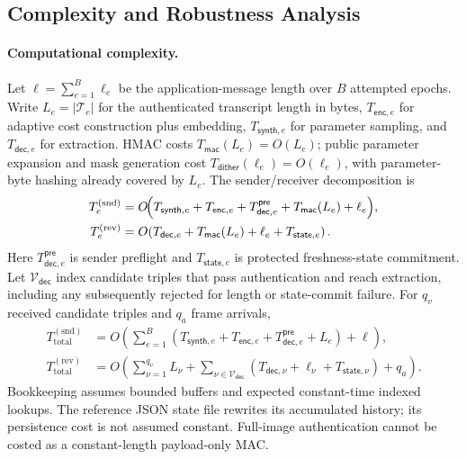 \documentclass[pdflatex,sn-mathphys-num]{sn-jnl}%
\theoremstyle{definition}
\theoremstyle{game}
\theoremstyle{thmstyleone}%
\theoremstyle{thmstyletwo}%
\theoremstyle{thmstylethree}%
\begin{document}
\subsection{Complexity and Robustness Analysis}\label{subsec:complexity-robustness}
\paragraph{Computational complexity.}
Let $\ell=\sum_{e=1}^{B}\ell_e$ be the application-message length over
$B$ attempted epochs. Write $L_e=|\mathcal T_e|$ for the authenticated
transcript length in bytes, $T_{\mathsf{enc},e}$ for adaptive cost construction
plus embedding, $T_{\mathsf{synth},e}$ for parameter sampling, and
$T_{\mathsf{dec},e}$ for extraction. HMAC costs
$T_{\mathsf{mac}}(L_e)=O(L_e)$; public parameter expansion and mask generation
cost $T_{\mathsf{dither}}(\ell_e)=O(\ell_e)$, with parameter-byte hashing
already covered by $L_e$. The sender/receiver decomposition is
\begin{align*}
T^{(\mathrm{snd})}_e
 &=O\!\Bigl(T_{\mathsf{synth},e}+T_{\mathsf{enc},e}+T_{\mathsf{dec},e}^{\mathsf{pre}}
 +T_{\mathsf{mac}}(L_e)+\ell_e\Bigr),\\
T^{(\mathrm{rev})}_e
 &=O\!\left(T_{\mathsf{dec},e}+T_{\mathsf{mac}}(L_e)
 +\ell_e+T_{\mathsf{state},e}\right).
\end{align*}
Here $T_{\mathsf{dec},e}^{\mathsf{pre}}$ is sender preflight and
$T_{\mathsf{state},e}$ is protected freshness-state commitment. Let $\mathcal V_{\mathsf{dec}}$ index candidate triples that pass
authentication and reach extraction, including any subsequently rejected
for length or state-commit failure. For $q_v$ received candidate triples
and $q_a$ frame arrivals,
\begin{align*}
T^{(\mathrm{snd})}_{\mathrm{total}}
 &=O\!\left(\sum_{e=1}^{B}
 (T_{\mathsf{synth},e}+T_{\mathsf{enc},e}+T_{\mathsf{dec},e}^{\mathsf{pre}}+L_e)+\ell\right),\\
T^{(\mathrm{rev})}_{\mathrm{total}}
 &=O\!\left(\sum_{\nu=1}^{q_v}L_\nu+
 \sum_{\nu\in\mathcal V_{\mathsf{dec}}}
 (T_{\mathsf{dec},\nu}+\ell_\nu+T_{\mathsf{state},\nu})+q_a\right).
\end{align*}
Bookkeeping assumes bounded buffers and expected constant-time indexed
lookups. The reference JSON state file rewrites its accumulated history;
its persistence cost is not assumed constant. Full-image authentication
cannot be costed as a constant-length payload-only MAC.
\end{document}
